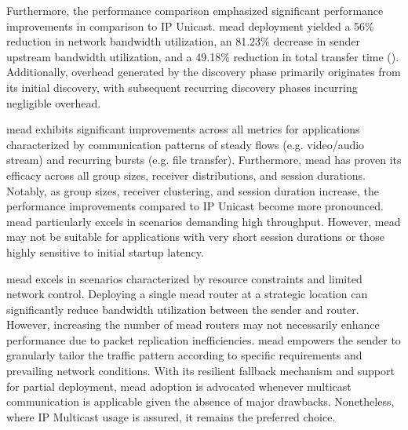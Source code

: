 Furthermore, the performance comparison emphasized significant performance
    improvements in comparison to IP Unicast.
\gls{mead} deployment yielded a 56\% reduction in network bandwidth
    utilization, an 81.23\% decrease in sender upstream bandwidth utilization,
    and a 49.18\% reduction in total transfer time (\ucii{}).
Additionally, overhead generated by the discovery phase primarily originates
    from its initial discovery, with subsequent recurring discovery phases
    incurring negligible overhead.

\gls{mead} exhibits significant improvements across all metrics for
    applications characterized by communication patterns of steady flows
    (e.g. video/audio stream) and recurring bursts (e.g. file transfer).
Furthermore, \gls{mead} has proven its efficacy across all group sizes,
    receiver distributions, and session durations.
Notably, as group sizes, receiver clustering, and session duration increase,
    the performance improvements compared to IP Unicast become more pronounced.
\gls{mead} particularly excels in scenarios demanding high throughput.
However, \gls{mead} may not be suitable for applications with very short
    session durations or those highly sensitive to initial startup latency.

\gls{mead} excels in scenarios characterized by resource constraints and
    limited network control.
Deploying a single \gls{mead} router at a strategic location can significantly
    reduce bandwidth utilization between the sender and router.
However, increasing the number of \gls{mead} routers may not necessarily
    enhance performance due to packet replication inefficiencies.
\gls{mead} empowers the sender to granularly tailor the traffic pattern
    according to specific requirements and prevailing network conditions.
With its resilient fallback mechanism and support for partial deployment,
    \gls{mead} adoption is advocated whenever multicast communication is
    applicable given the absence of major drawbacks.
Nonetheless, where IP Multicast usage is assured, it remains the preferred
    choice.

